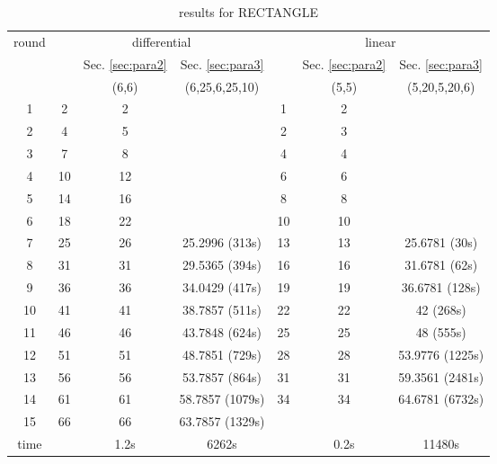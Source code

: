 \begin{table}
	\caption{results for RECTANGLE}\label{tab:rect}
	\centering
	\begin{tabular}{|c|c|c|c|c|c|c|}
		\hline
		\multirow{3}{*}{round}&\multicolumn{3}{|c|}{differential}&\multicolumn{3}{|c|}{linear}\\
        \cline{2-7}
		&\multirow{2}{*}{\cite{ZBL15}}&Sec. \ref{sec:para2}&Sec. \ref{sec:para3}&\multirow{2}{*}{\cite{ZBL15}}&Sec. \ref{sec:para2}&Sec. \ref{sec:para3}\\
		\cline{3-4}\cline{6-7}
		&&(6,6)&(6,25,6,25,10)&&(5,5)&(5,20,5,20,6)\\
        \hline
		1&	2&	2&	& 			1&	2&	\\
		2&	4&	5&	& 			2&	3&	\\
		3&	7&	8&	& 			4&	4&	\\
		4&	10&	12&	& 			6&	6&	\\
		5&	14&	16&	& 			8&	8&	\\
		6&	18&	22&	& 			10&	10&	\\
		7&	25&	26&	25.2996 (313s)&	13&	13&	25.6781 (30s)\\
		8&	31&	31&	29.5365 (394s)&	16&	16&	31.6781 (62s)\\
		9&	36&	36&	34.0429 (417s)&	19&	19&	36.6781 (128s)\\
		10&	41&	41&	38.7857 (511s)&	22&	22&	42 (268s)\\
		11&	46&	46&	43.7848 (624s)&	25&	25&	48 (555s)\\
		12&	51&	51&	48.7851 (729s)&	28&	28&	53.9776 (1225s)\\
		13&	56&	56&	53.7857 (864s)&	31&	31&	59.3561 (2481s)\\
		14&	61&	61&	58.7857 (1079s)&	34&	34&	64.6781 (6732s)\\
		15&	66&	66&	63.7857 (1329s)&	&	&	\\
		\hline
		time& &1.2s&6262s& &0.2s&11480s\\
		\hline
	\end{tabular}
\end{table}

